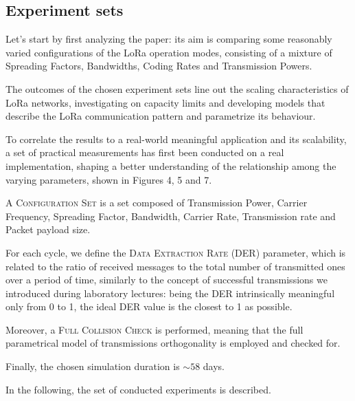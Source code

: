 \documentclass[a4paper,11pt]{article} %
\begin{document}
    \subsection{Experiment sets}\label{subsec:experiment-sets}

    Let's start by first analyzing the paper: its aim is comparing some reasonably varied configurations of the LoRa operation modes, consisting of a mixture of Spreading Factors, Bandwidths, Coding Rates and Transmission Powers.

    \smallskip

    The outcomes of the chosen experiment sets line out the scaling characteristics of LoRa networks, investigating on capacity limits and developing models that describe the LoRa communication pattern and parametrize its behaviour.

    \smallskip

    To correlate the results to a real-world meaningful application and its scalability, a set of practical measurements has first been conducted on a real implementation, shaping a better understanding of the relationship among the varying parameters, shown in Figures 4, 5 and 7.

    \smallskip

    A \textsc{Configuration Set} is a set composed of Transmission Power, Carrier Frequency, Spreading Factor, Bandwidth, Carrier Rate, Transmission rate and Packet payload size.

    \smallskip

    For each cycle, we define the \textsc{Data Extraction Rate} (\textsc{DER}) parameter, which is related to the ratio of received messages to the total number of transmitted ones over a period of time, similarly to the concept of successful transmissions we introduced during laboratory lectures: being the \textsc{DER} intrinsically meaningful only from 0 to 1, the ideal \textsc{DER} value is the closest to 1 as possible.

    \smallskip

    \label{full-collision}
    Moreover, a \textsc{Full Collision Check} is performed, meaning that the full parametrical model of transmissions orthogonality is employed and checked for.

    \smallskip

    Finally, the chosen simulation duration is $\sim 58$ days.

    \medskip

    In the following, the set of conducted experiments is described.
\end{document}
